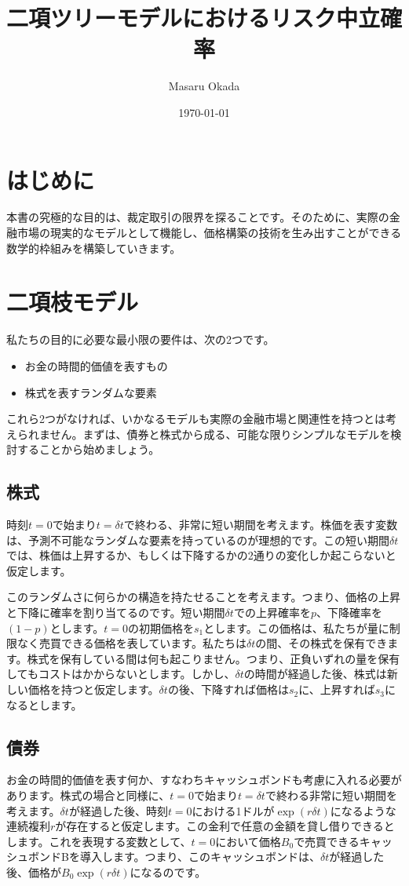 \documentclass[uplatex,a4j,12pt,dvipdfmx]{jsarticle}
\title{
二項ツリーモデルにおけるリスク中立確率
}
\author{Masaru Okada}
\date{\today}
\begin{document}
\maketitle

\tableofcontents

\newpage

\section{はじめに}
本書の究極的な目的は、裁定取引の限界を探ることです。そのために、実際の金融市場の現実的なモデルとして機能し、価格構築の技術を生み出すことができる数学的枠組みを構築していきます。

\section{二項枝モデル}
私たちの目的に必要な最小限の要件は、次の2つです。
\begin{itemize}
	\item お金の時間的価値を表すもの
	\item 株式を表すランダムな要素
\end{itemize}
これら2つがなければ、いかなるモデルも実際の金融市場と関連性を持つとは考えられません。まずは、債券と株式から成る、可能な限りシンプルなモデルを検討することから始めましょう。

\subsection{株式}
時刻$t=0$で始まり$t=\delta t$で終わる、非常に短い期間を考えます。株価を表す変数は、予測不可能なランダムな要素を持っているのが理想的です。この短い期間$\delta t$では、株価は上昇するか、もしくは下降するかの2通りの変化しか起こらないと仮定します。

このランダムさに何らかの構造を持たせることを考えます。つまり、価格の上昇と下降に確率を割り当てるのです。短い期間$\delta t$での上昇確率を$p$、下降確率を$(1-p)$とします。$t=0$の初期価格を$s_1$とします。この価格は、私たちが量に制限なく売買できる価格を表しています。私たちは$\delta t$の間、その株式を保有できます。株式を保有している間は何も起こりません。つまり、正負いずれの量を保有してもコストはかからないとします。しかし、$\delta t$の時間が経過した後、株式は新しい価格を持つと仮定します。$\delta t$の後、下降すれば価格は$s_2$に、上昇すれば$s_3$になるとします。

\subsection{債券}
お金の時間的価値を表す何か、すなわちキャッシュボンドも考慮に入れる必要があります。株式の場合と同様に、$t=0$で始まり$t=\delta t$で終わる非常に短い期間を考えます。$\delta t$が経過した後、時刻$t=0$における1ドルが$\exp(r\delta t)$になるような連続複利$r$が存在すると仮定します。この金利で任意の金額を貸し借りできるとします。これを表現する変数として、$t=0$において価格$B_0$で売買できるキャッシュボンドBを導入します。つまり、このキャッシュボンドは、$\delta t$が経過した後、価格が$B_0 \exp(r\delta t)$になるのです。
\end{document}
